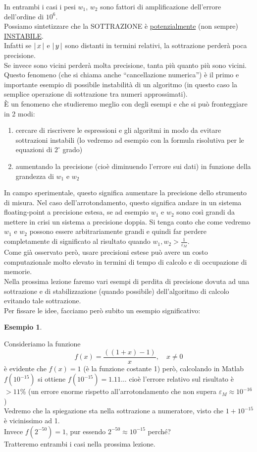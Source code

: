 \documentclass[12pt]{article}
\newtheorem*{esempio}{Esempio}
\DeclarePairedDelimiter{\abs}{\lvert}{\rvert}
\begin{document}
In entrambi i casi i pesi $w_1$, $w_2$ sono fattori di amplificazione dell'errore dell'ordine di $10^6$.\\
Possiamo sintetizzare che la SOTTRAZIONE è \underline{potenzialmente} (non sempre) \underline{INSTABILE}.\\
Infatti se $\abs{\,x\,}$ e $\abs{\,y\,}$ sono distanti in termini relativi, la sottrazione perderà poca precisione.\\
Se invece sono vicini perderà molta precisione, tanta più quanto più sono vicini.\\
Questo fenomeno (che si chiama anche “cancellazione numerica”) è il primo e importante esempio di possibile instabilità di un algoritmo (in questo caso la semplice operazione di sottrazione tra numeri approssimati).\\
È un fenomeno che studieremo meglio con degli esempi e che si può fronteggiare in 2 modi:
\begin{enumerate}
    \item cercare di riscrivere le espressioni e gli algoritmi in modo da evitare sottrazioni instabili (lo vedremo ad esempio con la formula risolutiva per le equazioni di $2^\circ$ grado)
    \item aumentando la precisione (cioè diminuendo l’errore sui dati) in funzione della grandezza di $w_1$ e $w_2$
\end{enumerate}
In campo sperimentale, questo significa aumentare la precisione dello strumento di misura. Nel caso dell'arrotondamento, questo significa andare in un sistema floating-point a precisione estesa, se ad esempio $w_1$ e $w_2$ sono così grandi da mettere in crisi un sistema a precisione doppia. Si tenga conto che come vedremo $w_1$ e $w_2$ possono essere arbitrariamente grandi e quindi far perdere completamente di significato al risultato quando $w_1, w_2 > \frac{1}{\varepsilon_M}$.\\
Come già osservato però, usare precisioni estese può avere un costo computazionale molto elevato in termini di tempo di calcolo e di occupazione di memorie.\\
Nella prossima lezione faremo vari esempi di perdita di precisione dovuta ad una sottrazione e di stabilizzazione (quando possibile) dell'algoritmo di calcolo evitando tale sottrazione.\\
Per fissare le idee, facciamo però subito un esempio significativo: 
\begin{esempio}\end{esempio}
Consideriamo la funzione
\[f(x) = \frac{((1 + x) - 1)}{x}, \quad x \ne 0\]
è evidente che $f(x) = 1$ (è la funzione costante 1) però, calcolando in Matlab $f(10^{-15})$ si ottiene $f(10^{-15}) = 1.11\dotsc$ cioè l’errore relativo sul risultato è $>11\%$ (un errore enorme rispetto all'arrotondamento che non supera $\varepsilon_M \approx 10^{-16}$)\\
Vedremo che la spiegazione sta nella sottrazione a numeratore, visto che $1+10^{-15}$ è vicinissimo ad 1.\\
Invece $f(2^{-50}) = 1$, pur essendo $2^{-50} \approx 10^{-15}$ perché?\\
Tratteremo entrambi i casi nella prossima lezione.
\end{document}
